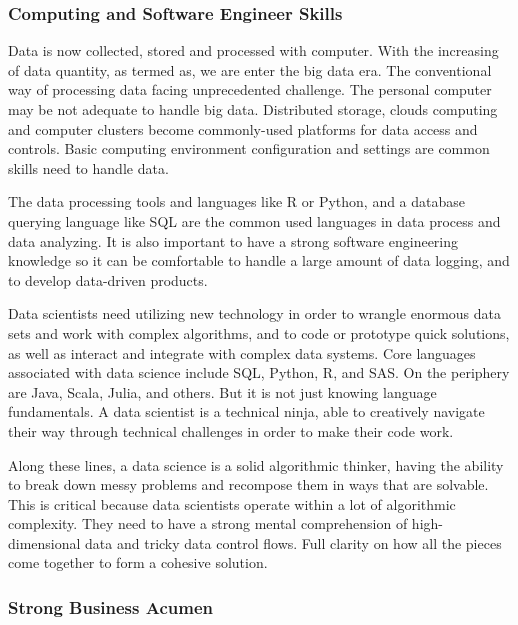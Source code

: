 \documentclass[
]{book}
\begin{document}
\hypertarget{computing-and-software-engineer-skills}{%
\subsubsection{Computing and Software Engineer Skills}\label{computing-and-software-engineer-skills}}

Data is now collected, stored and processed with computer. With the increasing of data quantity, as termed as, we are enter the big data era. The conventional way of processing data facing unprecedented challenge. The personal computer may be not adequate to handle big data. Distributed storage, clouds computing and computer clusters become commonly-used platforms for data access and controls. Basic computing environment configuration and settings are common skills need to handle data.

The data processing tools and languages like R or Python, and a database querying language like SQL are the common used languages in data process and data analyzing. It is also important to have a strong software engineering knowledge so it can be comfortable to handle a large amount of data logging, and to develop data-driven products.

Data scientists need utilizing new technology in order to wrangle enormous data sets and work with complex algorithms, and to code or prototype quick solutions, as well as interact and integrate with complex data systems. Core languages associated with data science include SQL, Python, R, and SAS. On the periphery are Java, Scala, Julia, and others. But it is not just knowing language fundamentals. A data scientist is a technical ninja, able to creatively navigate their way through technical challenges in order to make their code work.

Along these lines, a data science is a solid algorithmic thinker, having the ability to break down messy problems and recompose them in ways that are solvable. This is critical because data scientists operate within a lot of algorithmic complexity. They need to have a strong mental comprehension of high-dimensional data and tricky data control flows. Full clarity on how all the pieces come together to form a cohesive solution.

\hypertarget{strong-business-acumen}{%
\subsubsection{Strong Business Acumen}\label{strong-business-acumen}}
\end{document}
